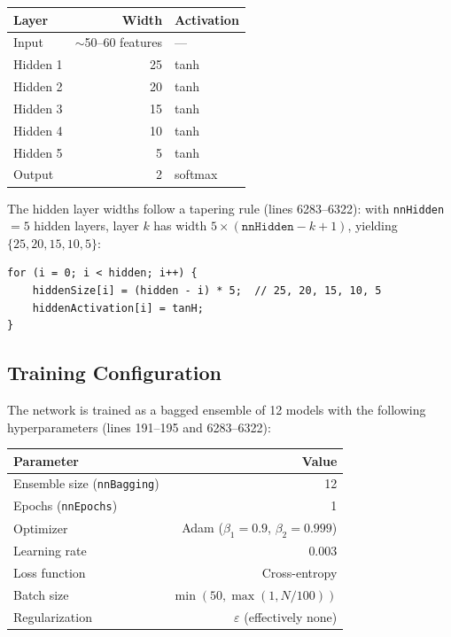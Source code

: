 \documentclass[11pt,a4paper]{article}
\begin{document}
\begin{center}
\begin{tabular}{lrl}
\toprule
\textbf{Layer} & \textbf{Width} & \textbf{Activation} \\
\midrule
Input & $\sim$50--60 features & --- \\
Hidden 1 & 25 & tanh \\
Hidden 2 & 20 & tanh \\
Hidden 3 & 15 & tanh \\
Hidden 4 & 10 & tanh \\
Hidden 5 & 5 & tanh \\
Output & 2 & softmax \\
\bottomrule
\end{tabular}
\end{center}

The hidden layer widths follow a tapering rule (lines 6283--6322): with \texttt{nnHidden}${}=5$ hidden layers, layer $k$ has width $5 \times (\texttt{nnHidden} - k + 1)$, yielding $\{25, 20, 15, 10, 5\}$:

\begin{lstlisting}[caption={Hidden layer size computation (from NNClassifier constructor)}]
for (i = 0; i < hidden; i++) {
    hiddenSize[i] = (hidden - i) * 5;  // 25, 20, 15, 10, 5
    hiddenActivation[i] = tanH;
}
\end{lstlisting}

\subsection{Training Configuration}

The network is trained as a bagged ensemble of 12 models with the following hyperparameters (lines 191--195 and 6283--6322):

\begin{center}
\begin{tabular}{lr}
\toprule
\textbf{Parameter} & \textbf{Value} \\
\midrule
Ensemble size (\texttt{nnBagging}) & 12 \\
Epochs (\texttt{nnEpochs}) & 1 \\
Optimizer & Adam ($\beta_1 = 0.9$, $\beta_2 = 0.999$) \\
Learning rate & 0.003 \\
Loss function & Cross-entropy \\
Batch size & $\min(50, \max(1, N/100))$ \\
Regularization & $\varepsilon$ (effectively none) \\
\bottomrule
\end{tabular}
\end{center}
\end{document}
